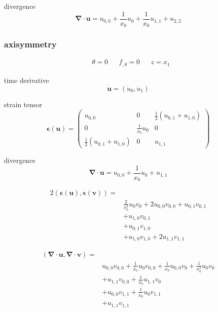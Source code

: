 \documentclass{scrartcl}
\newcommand{\vect}[1]{\boldsymbol{#1}}
\newcommand{\ten}[1]{\boldsymbol{#1}}
\begin{document}
divergence
\[
\vect{\nabla} \cdot \vect{u} = u_{0,0} + \frac{1}{x_0}u_0 + \frac{1}{x_0}u_{1,1}
+ u_{2,2}
\]

\subsubsection{axisymmetry}

\begin{align*}
&\theta = 0 & &f_{,\theta} = 0 & & z = x_1
\end{align*}

time derivative
\[
\dot{\vect{u}} = ( \dot{u}_0, \dot{u}_1 )
\]

strain tensor
\[
\ten{\epsilon}(\vect{u}) = 
\begin{pmatrix}
u_{0,0} & 0 & \frac{1}{2}(u_{0,1} + u_{1,0}) \\
0 & \frac{1}{x_0}u_0 & 0 \\
\frac{1}{2}(u_{0,1} + u_{1,0}) & 0 & u_{1,1} 
\end{pmatrix}
\]

divergence
\[
\vect{\nabla} \cdot \vect{u} = u_{0,0} + \frac{1}{x_0}u_0 + u_{1,1}
\]

\begin{align*}
2(\ten{\epsilon}(\vect{u}), \ten{\epsilon}(\vect{v})) =& \\
&\frac{2}{x_0^2}u_0 v_0 + 2 u_{0,0} v_{0,0} + u_{0,1} v_{0,1} \\
&+ u_{1,0} v_{0,1} \\
&+ u_{0,1} v_{1,0} \\
&+ u_{1,0} v_{1,0} + 2 u_{1,1} v_{1,1}
\end{align*}

\begin{align*}
(\vect{\nabla} \cdot \vect{u}, \vect{\nabla} \cdot \vect{v}) =& \\
& u_{0,0} v_{0,0} + \frac{1}{x_0} u_0 v_{0,0} 
+ \frac{1}{x_0} u_{0,0} v_0 + \frac{1}{x_0^2} u_0 v_0 \\
&+ u_{1,1} v_{0,0} + \frac{1}{x_0} u_{1,1} v_0 \\
&+ u_{0,0} v_{1,1} + \frac{1}{x_0} u_0 v_{1,1} \\
&+ u_{1,1} v_{1,1}
\end{align*}
\end{document}
